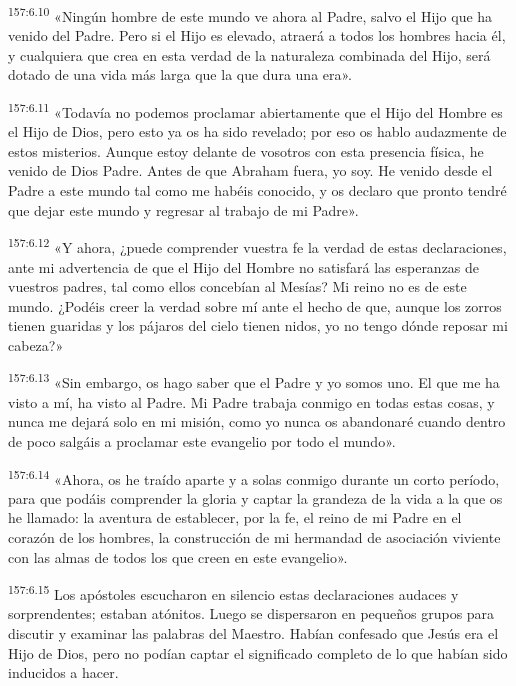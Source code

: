 \par 
\textsuperscript{157:6.10} «Ningún hombre de este mundo ve ahora al Padre, salvo el Hijo que ha venido del Padre. Pero si el Hijo es elevado, atraerá a todos los hombres hacia él, y cualquiera que crea en esta verdad de la naturaleza combinada del Hijo, será dotado de una vida más larga que la que dura una era».

\par 
\textsuperscript{157:6.11} «Todavía no podemos proclamar abiertamente que el Hijo del Hombre es el Hijo de Dios, pero esto ya os ha sido revelado; por eso os hablo audazmente de estos misterios. Aunque estoy delante de vosotros con esta presencia física, he venido de Dios Padre. Antes de que Abraham fuera, yo soy. He venido desde el Padre a este mundo tal como me habéis conocido, y os declaro que pronto tendré que dejar este mundo y regresar al trabajo de mi Padre».

\par 
\textsuperscript{157:6.12} «Y ahora, ¿puede comprender vuestra fe la verdad de estas declaraciones, ante mi advertencia de que el Hijo del Hombre no satisfará las esperanzas de vuestros padres, tal como ellos concebían al Mesías? Mi reino no es de este mundo. ¿Podéis creer la verdad sobre mí ante el hecho de que, aunque los zorros tienen guaridas y los pájaros del cielo tienen nidos, yo no tengo dónde reposar mi cabeza?»

\par 
\textsuperscript{157:6.13} «Sin embargo, os hago saber que el Padre y yo somos uno. El que me ha visto a mí, ha visto al Padre. Mi Padre trabaja conmigo en todas estas cosas, y nunca me dejará solo en mi misión, como yo nunca os abandonaré cuando dentro de poco salgáis a proclamar este evangelio por todo el mundo».

\par 
\textsuperscript{157:6.14} «Ahora, os he traído aparte y a solas conmigo durante un corto período, para que podáis comprender la gloria y captar la grandeza de la vida a la que os he llamado: la aventura de establecer, por la fe, el reino de mi Padre en el corazón de los hombres, la construcción de mi hermandad de asociación viviente con las almas de todos los que creen en este evangelio».

\par 
\textsuperscript{157:6.15} Los apóstoles escucharon en silencio estas declaraciones audaces y sorprendentes; estaban atónitos. Luego se dispersaron en pequeños grupos para discutir y examinar las palabras del Maestro. Habían confesado que Jesús era el Hijo de Dios, pero no podían captar el significado completo de lo que habían sido inducidos a hacer.

